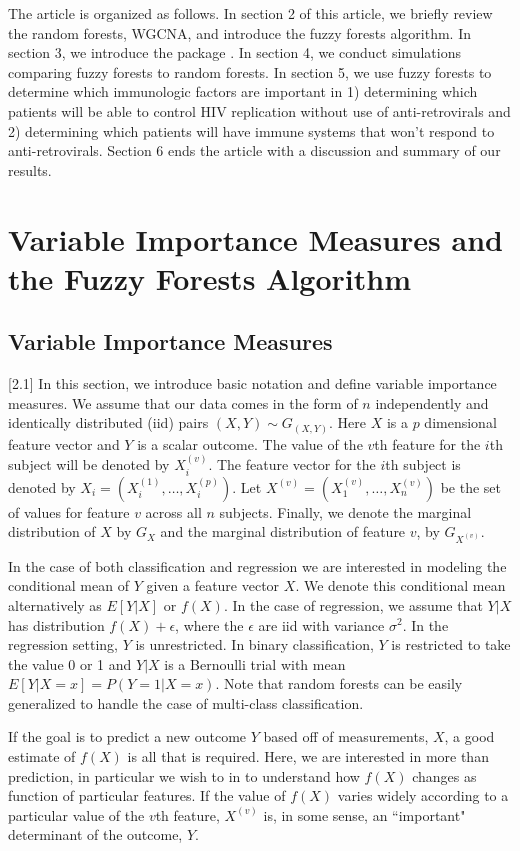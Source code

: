 \documentclass[article,shortnames]{jss}
\begin{document}
The article is organized as follows.  In section 2 of this article, we briefly review the random forests, WGCNA, and introduce the fuzzy forests algorithm.
In section 3, we introduce the  package .  In section 4, we conduct simulations comparing fuzzy forests to random forests.  In section 5, we use fuzzy forests to determine which immunologic factors are important in 1) determining which patients will be able to control HIV replication without
use of anti-retrovirals and 2) determining which patients will have immune systems that won't respond to anti-retrovirals.  Section 6 ends the article with a discussion and summary of our results. 

\section{Variable Importance Measures and the Fuzzy Forests Algorithm}
\subsection{Variable Importance Measures}[2.1]
In this section, we introduce basic notation and define variable importance measures.  We assume that our data comes in the form of $n$ independently and identically distributed (iid) pairs $(X,Y) \sim G_{(X, Y)}$.  
Here $X$ is a $p$ dimensional feature vector and $Y$ is a scalar outcome.  The value of the $v$th feature for the $i$th subject will be denoted by $X_{i}^{(v)}$.
The feature vector for the $i$th subject is denoted by $X_{i}=(X_{i}^{(1)},\ldots,X_{i}^{(p)})$.   Let $X^{(v)}=(X_{1}^{(v)},\ldots,X_{n}^{(v)})$ be the set of values for feature $v$ across all $n$ subjects.  Finally, we denote the marginal distribution of $X$ by $G_{X}$ and the marginal distribution of
feature $v$, by $G_{X^{(v)}}$.

In the case of both classification and regression we are interested in modeling the conditional mean of $Y$ given a feature vector $X$.  We denote this conditional mean alternatively as $E[Y|X]$ or $f(X)$.
In the case of regression, we assume that $Y|X$ has distribution $f(X) + \epsilon$, where the $\epsilon$ are iid with variance $\sigma^{2}$.   In the regression setting, $Y$ is unrestricted. 
In binary classification, $Y$ is restricted to take the value 0 or 1 and $Y|X$ is a Bernoulli trial with mean $E[Y|X=x]=P(Y=1|X=x)$.  
Note that random forests can be easily generalized to handle the case of multi-class classification.  

If the goal is to predict a new outcome $Y$ based off of measurements, $X$, a good estimate of $f(X)$ is all that is required.
Here, we are interested in more than prediction,  in particular we wish to in to understand how $f(X)$ changes as function of particular features. 
If the value of $f(X)$ varies widely according to a particular value of the $v$th feature, $X^{(v)}$ is, in some sense, an ``important" determinant of
the outcome, $Y$.  
\end{document}
